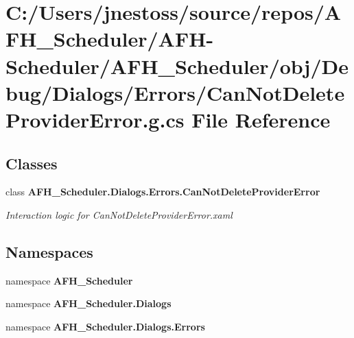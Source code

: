 \section{C\+:/\+Users/jnestoss/source/repos/\+A\+F\+H\+\_\+\+Scheduler/\+A\+F\+H-\/\+Scheduler/\+A\+F\+H\+\_\+\+Scheduler/obj/\+Debug/\+Dialogs/\+Errors/\+Can\+Not\+Delete\+Provider\+Error.g.\+cs File Reference}
\label{_debug_2_dialogs_2_errors_2_can_not_delete_provider_error_8g_8cs}
\subsection*{Classes}
\begin{DoxyCompactItemize}
\item 
class \textbf{ A\+F\+H\+\_\+\+Scheduler.\+Dialogs.\+Errors.\+Can\+Not\+Delete\+Provider\+Error}
\begin{DoxyCompactList}\small\item\em Interaction logic for Can\+Not\+Delete\+Provider\+Error.\+xaml \end{DoxyCompactList}\end{DoxyCompactItemize}
\subsection*{Namespaces}
\begin{DoxyCompactItemize}
\item 
namespace \textbf{ A\+F\+H\+\_\+\+Scheduler}
\item 
namespace \textbf{ A\+F\+H\+\_\+\+Scheduler.\+Dialogs}
\item 
namespace \textbf{ A\+F\+H\+\_\+\+Scheduler.\+Dialogs.\+Errors}
\end{DoxyCompactItemize}
